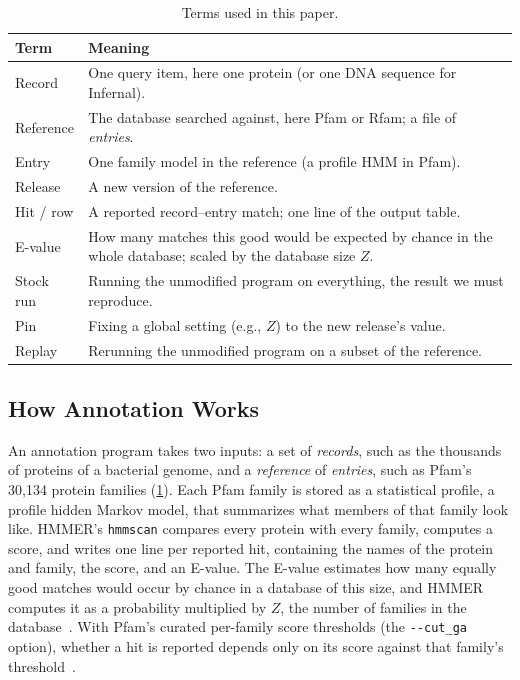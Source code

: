 \documentclass[letterpaper,twocolumn,10pt]{article}
\theoremstyle{definition}
\newcommand{\cutga}{\texttt{-{}-cut\_ga}\xspace}
\begin{document}
\begin{table}[t]
\caption{Terms used in this paper.}
\label{tab:glossary}
\centering\footnotesize
\setlength{\tabcolsep}{3pt}
\begin{tabular}{@{}>{\raggedright\arraybackslash}p{1.6cm}>{\raggedright\arraybackslash}p{6.2cm}@{}}
\toprule
Term & Meaning \\
\midrule
Record & One query item, here one protein (or one DNA sequence for Infernal). \\
Reference & The database searched against, here Pfam or Rfam; a file of \textit{entries}. \\
Entry & One family model in the reference (a profile HMM in Pfam). \\
Release & A new version of the reference. \\
Hit / row & A reported record--entry match; one line of the output table. \\
E-value & How many matches this good would be expected by chance in the whole database; scaled by the database size $Z$. \\
Stock run & Running the unmodified program on everything, the result we must reproduce. \\
Pin & Fixing a global setting (e.g., $Z$) to the new release's value. \\
Replay & Rerunning the unmodified program on a subset of the reference. \\
\bottomrule
\end{tabular}
\end{table}

\subsection{How Annotation Works}

An annotation program takes two inputs: a set of \textit{records}, such as the thousands of proteins of a bacterial
genome, and a \textit{reference} of \textit{entries}, such as Pfam's 30{,}134 protein families (\cref{tab:glossary}).
Each Pfam family is stored as a statistical profile, a profile hidden Markov model, that summarizes what members
of that family look like. HMMER's \texttt{hmmscan} compares every protein with every family, computes a score, and
writes one line per reported hit, containing the names of the protein and family, the score, and an E-value. The
E-value estimates how many equally good matches would occur by chance in a database of this size, and HMMER computes
it as a probability multiplied by $Z$, the number of families in the database~\cite{eddy2011hmmer}. With Pfam's curated
per\nobreakdash-family score thresholds (the \cutga option), whether a hit is reported depends only on its score against that
family's threshold~\cite{pfam2025}.
\end{document}
